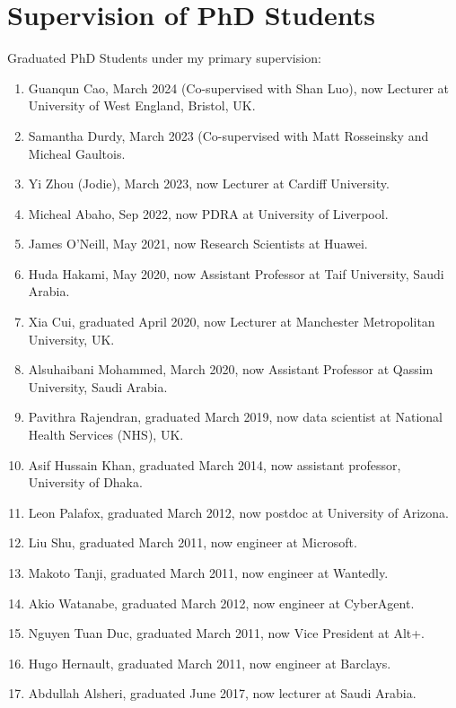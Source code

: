 \documentclass[a4paper,11pt]{article}
\begin{document}
\section{Supervision of PhD Students}
Graduated PhD Students under my primary supervision:
\begin{enumerate}
\item Guanqun Cao, March 2024 (Co-supervised with Shan Luo), now Lecturer at University of West England, Bristol, UK.
\item Samantha Durdy, March 2023 (Co-supervised with Matt Rosseinsky and Micheal Gaultois.
\item Yi Zhou (Jodie), March 2023, now Lecturer at Cardiff University.
\item Micheal Abaho, Sep 2022, now PDRA at University of Liverpool.
\item James O'Neill, May 2021, now Research Scientists at Huawei.
\item Huda Hakami, May 2020, now Assistant Professor at Taif University, Saudi Arabia.
\item Xia Cui, graduated April 2020, now Lecturer at Manchester Metropolitan University, UK.
\item Alsuhaibani Mohammed, March 2020, now Assistant Professor at  Qassim University, Saudi Arabia.
\item Pavithra Rajendran, graduated March 2019, now data scientist at National Health Services (NHS), UK.
\item Asif Hussain Khan, graduated March 2014, now assistant professor, University of Dhaka.
\item Leon Palafox, graduated March 2012, now postdoc at University of Arizona.
\item Liu Shu, graduated March 2011, now engineer at Microsoft.
\item Makoto Tanji, graduated March 2011, now engineer at Wantedly.
\item Akio Watanabe, graduated March 2012, now engineer at CyberAgent.
\item Nguyen Tuan Duc, graduated March 2011, now Vice President at Alt+.
\item Hugo Hernault, graduated March 2011, now engineer at Barclays.
\item  Abdullah Alsheri, graduated June 2017, now lecturer at Saudi Arabia.
\end{enumerate}
\end{document}
